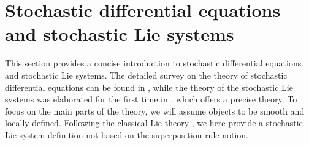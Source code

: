 \documentclass[11pt]{article}
\theoremstyle{plain}
\theoremstyle{definition}
\begin{document}
\section{Stochastic differential
equations and stochastic Lie systems}\label{Fundamentals}

This section provides a concise introduction to stochastic differential equations and stochastic Lie systems. The detailed survey on the theory of stochastic differential equations can be found in \cite{Ar74, E82}, while the theory of the stochastic Lie systems was elaborated for the first time in \cite{LO09}, which offers a precise theory. To focus on the main parts of the theory, we will assume objects to be smooth and locally defined. Following the classical Lie theory \cite{Lie1893}, we here provide a stochastic Lie system definition not based on the superposition rule notion.
\end{document}
